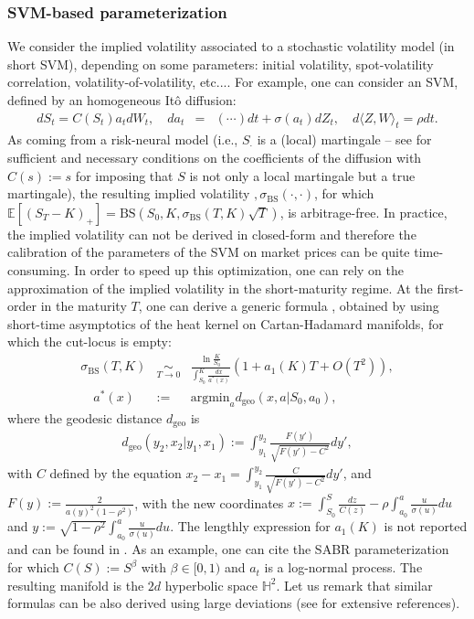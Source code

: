 \documentclass{amsart}%
\def\no{\noindent}
\theoremstyle{definition}
\theoremstyle{remark}
\newcommand{\bea}{\begin{eqnarray}}
\newcommand{\eea}{\end{eqnarray}}
\newcommand{\beaa}{\begin{eqnarray*}}
\newcommand{\eeaa}{\end{eqnarray*}}
\newcommand{\HH}{{\mathbb H}}
\newcommand{\EE}{{\mathbb E}}
\begin{document}
\subsubsection{SVM-based parameterization}
We consider the implied volatility associated to a stochastic volatility model (in short SVM), depending on some parameters: initial volatility, spot-volatility correlation, volatility-of-volatility, etc....  For example, one can consider an  SVM, defined by an homogeneous It\^o diffusion:
\beaa dS_t=C(S_t) a_t dW_t, \quad
da_t&=&(\cdots)dt + \sigma(a_t) dZ_t, \quad d \langle Z, W \rangle_t = \rho dt. \eeaa
As coming from a risk-neural model (i.e., $S_\cdot$ is a (local) martingale -- see \cite{henry2008analysis} for  sufficient and necessary conditions on the coefficients  of the diffusion with $C(s):=s$ for imposing that $S$ is not only a local martingale but a true martingale), the resulting implied volatility $,\sigma_\mathrm{BS }(\cdot,\cdot)$, for which $\EE[(S_T-K)_+]=\mathrm{BS}(S_0,K,\sigma_\mathrm{BS }(T,K) \sqrt{T})$, is arbitrage-free. In practice, the implied volatility can not be derived in closed-form and therefore the calibration of the parameters of the SVM on market prices can be quite time-consuming. In order to speed up this optimization, one can rely on the approximation of the  implied volatility in the short-maturity regime. At the first-order in the maturity $T$, one can derive a generic formula \cite{henry2008analysis}, obtained by using short-time asymptotics of the heat kernel on Cartan-Hadamard manifolds, for which the cut-locus is empty:
\bea \sigma_\mathrm{BS}(T,K) &\underset{T \rightarrow 0}{\sim}& \frac{ \ln\frac{K }{ S_0} }{ \int_{S_0}^K \frac{dx }{ a^*(x)} }\left( 1+ a_1(K)T + O(T^2) \right),  \nonumber \\ \quad a^*(x)&:=&\mathrm{argmin}_a d_\mathrm{geo}(x,a|S_0,a_0), \label{approximate} \eea
\no where the geodesic distance $d_\mathrm{geo}$ is
\beaa d_\mathrm{geo}(y_2,x_2|y_1,x_1):=\int_{y_1}^{y_2} \frac{F(y') }{ \sqrt{F(y')-C^2}} dy',
\eeaa
with $C$ defined by the equation $x_2-x_1=\int_{y_1}^{y_2}  \frac{C }{ \sqrt{F(y')-C^2}} dy'$, and $F(y):=\frac{2 }{ a(y)^2(1-\rho^2)}$,
with the new coordinates $x:=\int_{S_0}^S \frac{dz }{C(z)}-\rho \int_{a_0}^a \frac{u }{\sigma(u)} du$ and $y:=\sqrt{1- \rho^2} \int_{a_0}^a \frac{u }{\sigma(u)} du$.  The lengthly expression for $a_1(K)$ is not reported and can be found in \cite{henry2008analysis}. As an example, one can cite the SABR parameterization for which $C(S):=S^\beta$ with $\beta \in [0,1)$ and $a_t$ is a log-normal process. The resulting manifold is the $2d$ hyperbolic space $\HH^2$.  Let us remark that similar formulas can be also derived using large deviations (see \cite{friz2015large} for extensive references).
\end{document}
